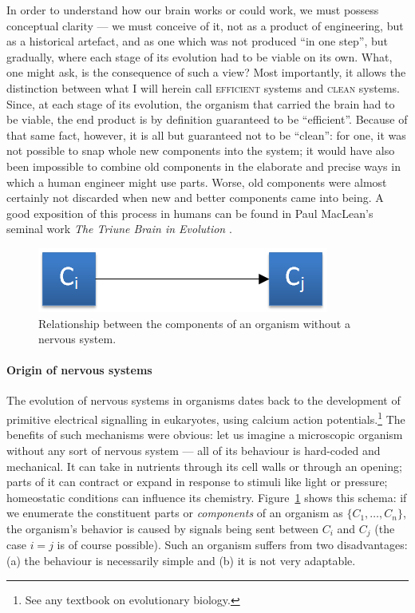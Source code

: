 \documentclass[]{scrartcl}
\theoremstyle{break}
\begin{document}
In order to understand how our brain works or could work, we must possess conceptual clarity --- we must conceive of it, not as a product of engineering, but as a historical artefact, and as one which was not produced ``in one step'', but gradually, where each stage of its evolution had to be viable on its own. What, one might ask, is the consequence of such a view?
Most importantly, it allows the distinction between what I will herein call \textsc{efficient} systems and \textsc{clean} systems. Since, at each stage of its evolution, the organism that carried the brain had to be viable, the end product is by definition guaranteed to be ``efficient''. Because of that same fact, however, it is all but guaranteed not to be ``clean'': for one, it was not possible to snap whole new components into the system; it would have also been impossible to combine old components in the elaborate and precise ways in which a human engineer might use parts. Worse, old components were almost certainly not discarded when new and better components came into being. A good exposition of this process in humans can be found in Paul MacLean's seminal work {\em The Triune Brain in Evolution} \cite{maclean1990}.

\begin{figure}[!h]
	\centering
	\includegraphics{figs/noNervousSystem.png}
	\caption{Relationship between the components of an organism without a nervous system.}
	\label{fig:noNervousSystem}
\end{figure}
\vspace{-0.18cm}
\paragraph{Origin of nervous systems} The evolution of nervous systems in organisms dates back to the development of primitive electrical signalling in eukaryotes, using calcium action potentials.\footnote{See any textbook on evolutionary biology.} The benefits of such mechanisms were obvious: let us imagine a microscopic organism without any sort of nervous system --- all of its behaviour is hard-coded and mechanical. It can take in nutrients through its cell walls or through an opening; parts of it can contract or expand in response to stimuli like light or pressure; homeostatic conditions can influence its chemistry. Figure~\ref{fig:noNervousSystem} shows this schema: if we enumerate the constituent parts or {\em components} of an organism as $\{C_1,\dots,C_n\}$, the organism's behavior is caused by signals being sent between $C_i$ and $C_j$ (the case $i=j$ is of course possible). Such an organism suffers from two disadvantages: (a) the behaviour is necessarily simple and (b) it is not very adaptable.
\end{document}
